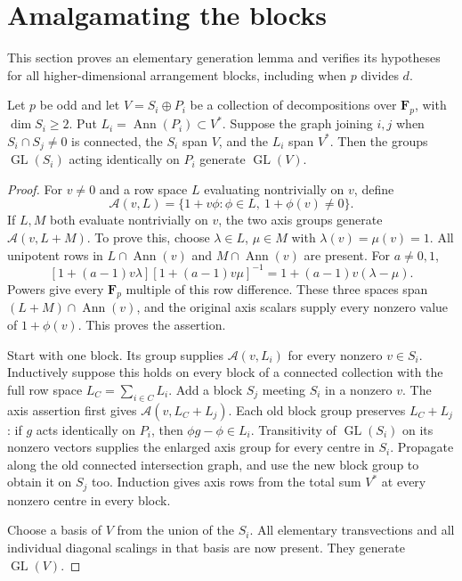 \section{Amalgamating the blocks}\label{sec:higher-amalgamation}
This section proves an elementary generation lemma and verifies its hypotheses for all higher-dimensional arrangement blocks, including when $p$ divides $d$.

\begin{lemma}\label{lem:higher-amalgamation}
Let $p$ be odd and let $V=S_i\oplus P_i$ be a collection of decompositions over $\mathbf F_p$, with $\dim S_i\ge2$. Put $L_i=\operatorname{Ann}(P_i)\subset V^*$. Suppose the graph joining $i,j$ when $S_i\cap S_j\ne0$ is connected, the $S_i$ span $V$, and the $L_i$ span $V^*$. Then the groups $\operatorname{GL}(S_i)$ acting identically on $P_i$ generate $\operatorname{GL}(V)$.
\end{lemma}
\begin{proof}
For $v\ne0$ and a row space $L$ evaluating nontrivially on $v$, define
\[
\mathcal A(v,L)=\{1+v\phi:\phi\in L,\ 1+\phi(v)\ne0\}.
\]
If $L,M$ both evaluate nontrivially on $v$, the two axis groups generate $\mathcal A(v,L+M)$. To prove this, choose $\lambda\in L$, $\mu\in M$ with $\lambda(v)=\mu(v)=1$. All unipotent rows in $L\cap\operatorname{Ann}(v)$ and $M\cap\operatorname{Ann}(v)$ are present. For $a\ne0,1$,
\[
[1+(a-1)v\lambda][1+(a-1)v\mu]^{-1}
 =1+(a-1)v(\lambda-\mu).
\]
Powers give every $\mathbf F_p$ multiple of this row difference. These three spaces span $(L+M)\cap\operatorname{Ann}(v)$, and the original axis scalars supply every nonzero value of $1+\phi(v)$. This proves the assertion.

Start with one block. Its group supplies $\mathcal A(v,L_i)$ for every nonzero $v\in S_i$. Inductively suppose this holds on every block of a connected collection with the full row space $L_C=\sum_{i\in C}L_i$. Add a block $S_j$ meeting $S_i$ in a nonzero $v$. The axis assertion first gives $\mathcal A(v,L_C+L_j)$. Each old block group preserves $L_C+L_j$: if $g$ acts identically on $P_i$, then $\phi g-\phi\in L_i$. Transitivity of $\operatorname{GL}(S_i)$ on its nonzero vectors supplies the enlarged axis group for every centre in $S_i$. Propagate along the old connected intersection graph, and use the new block group to obtain it on $S_j$ too. Induction gives axis rows from the total sum $V^*$ at every nonzero centre in every block.

Choose a basis of $V$ from the union of the $S_i$. All elementary transvections and all individual diagonal scalings in that basis are now present. They generate $\operatorname{GL}(V)$.
\end{proof}

